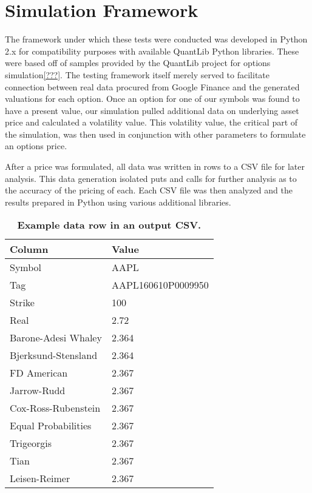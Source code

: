 \section{Simulation Framework}

The framework under which these tests were conducted was developed in Python 2.x for compatibility purposes with available QuantLib Python libraries. These were based off of samples provided by the QuantLib project for options simulation\ref{???}. The testing framework itself merely served to facilitate connection between real data procured from Google Finance and the generated valuations for each option. Once an option for one of our symbols was found to have a present value, our simulation pulled additional data on underlying asset price and calculated a volatility value. This volatility value, the critical part of the simulation, was then used in conjunction with other parameters to formulate an options price. 

After a price was formulated, all data was written in rows to a CSV file for later analysis. This data generation isolated puts and calls for further analysis as to the accuracy of the pricing of each. Each CSV file was then analyzed and the results prepared in Python using various additional libraries.

\begin{table}[h!]
\centering
\begin{tabu} to .8\textwidth { | X[c] | X[c] |  }
 \hline
 Column & Value \\
 \hline
 Symbol & AAPL \\
 Tag & AAPL160610P0009950  \\
Strike & 100 \\
Real & 2.72 \\
Barone-Adesi Whaley & 2.364 \\
Bjerksund-Stensland & 2.364 \\
FD American & 2.367 \\
Jarrow-Rudd & 2.367 \\
Cox-Ross-Rubenstein & 2.367 \\
Equal Probabilities & 2.367 \\
Trigeorgis & 2.367 \\
Tian & 2.367 \\
Leisen-Reimer & 2.367 \\
\hline
\end{tabu}
\caption {\textbf{Example data row in an output CSV.}}
\end{table}


